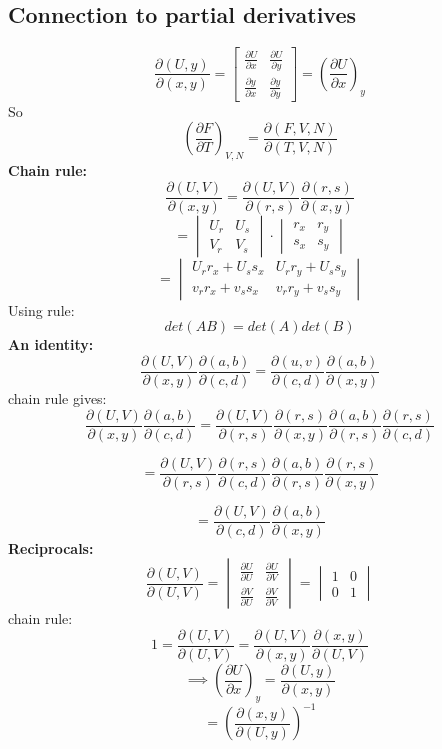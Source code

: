 \documentclass[11pt]{book}
\theoremstyle{definition}
\begin{document}
\subsection{Connection to partial derivatives}
\[ \frac{\partial (U,y)}{\partial (x,y)} = \begin{bmatrix} 
\frac{\partial U}{\partial x} & \frac{\partial U}{\partial y} \\
\frac{\partial y}{\partial x} & \frac{\partial y}{\partial y}
\end{bmatrix}  = \left( \frac{\partial U}{\partial x} \right)_y \] 
 So
 \[ \left( \frac{\partial F}{\partial T} \right)_{V,N} = \frac{\partial (F,V,N)}{\partial (T,V,N)}  \] 
 \textbf{Chain rule:} 
 \[ \frac{\partial (U,V)}{\partial (x,y)} = \frac{\partial (U,V)}{\partial (r,s)} \frac{\partial (r,s)}{\partial (x,y)} \] 
 \[ = \begin{vmatrix}
	 U_r & U_s \\
	 V_r & V_s
 \end{vmatrix} \cdot
\begin{vmatrix}
	r_x & r_y \\
	s_x & s_y
\end{vmatrix}\] 
\[ = \begin{vmatrix}
	U_r r_x + U_s s_x & U_r r_y + U_s s_y \\
	v_r r_x + v_s s_x & v_r r_y + v_s s_y
\end{vmatrix} \] 
 Using rule:
 \[ det(AB) = det(A)det(B) \] 
 \textbf{An identity:} 
 \[ \frac{\partial (U,V)}{\partial (x,y)} \frac{\partial (a,b)}{\partial (c,d)} = \frac{\partial (u,v)}{\partial (c,d)} \frac{\partial (a,b)}{\partial (x,y)} \] 
 chain rule gives:
 \[ \frac{\partial (U,V)}{\partial (x,y)} \frac{\partial (a,b)}{\partial (c,d)} = \frac{\partial (U,V)}{\partial (r,s)} \frac{\partial (r,s)}{\partial (x,y)} \frac{\partial (a,b)}{\partial (r,s)} \frac{\partial (r,s)}{\partial (c,d)} \] 
 
\[ = \frac{\partial (U,V)}{\partial (r,s)} \frac{\partial (r,s)}{\partial (c,d)} \frac{\partial (a,b)}{\partial (r,s)} \frac{\partial (r,s)}{\partial (x,y)} \] 

\[ = \frac{\partial (U,V)}{\partial (c,d)} \frac{\partial (a,b)}{\partial (x,y)} \] 
\textbf{Reciprocals:} 
\[ \frac{\partial (U,V)}{\partial (U,V)} = \begin{vmatrix}
	\frac{\partial U}{\partial U} & \frac{\partial U}{\partial V} \\
	\frac{\partial V}{\partial U} & \frac{\partial V}{\partial V}	
\end{vmatrix} = \begin{vmatrix}
	1 & 0 \\
	0 & 1	
\end{vmatrix}\]
chain rule:
\[ 1 = \frac{\partial (U,V)}{\partial (U,V)} = \frac{\partial (U,V)}{\partial (x,y)} \frac{\partial (x,y)}{\partial (U,V)} \] 
\[ \implies \left( \frac{\partial U}{\partial x} \right)_y = \frac{\partial (U,y)}{\partial (x,y)}  \] 
\[ = \left( \frac{\partial (x,y)}{\partial (U,y)} \right)^{-1}  \] 
\end{document}
